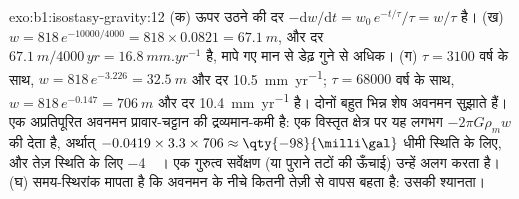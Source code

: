 \begin{solution}{exo:b1:isostasy-gravity:12}
(क) ऊपर उठने की दर $-\mathrm dw/\mathrm dt = w_0\,e^{-t/\tau}/\tau = w/\tau$ है। (ख) $w = 818\,e^{-10000/4000} = 818\times0.0821 = \qty{67.1}{m}$, और दर
$\qty{67.1}{m}/\num{4000}\,\unit{yr} = \qty{16.8}{mm.yr^{-1}}$ है, मापे गए मान से डेढ़ गुने से अधिक। (ग) $\tau = 3100$ वर्ष के साथ, $w =
818\,e^{-3.226} = \qty{32.5}{m}$ और दर \qty{10.5}{mm.yr^{-1}}; $\tau = \num{68000}$ वर्ष के साथ, $w = 818\,e^{-0.147} = \qty{706}{m}$ और दर
\qty{10.4}{mm.yr^{-1}} है। दोनों बहुत भिन्न शेष अवनमन सुझाते हैं। एक अप्रतिपूरित अवनमन प्रावार-चट्टान की द्रव्यमान-कमी है: एक विस्तृत क्षेत्र पर यह लगभग $-2\pi G\rho_m w$ की  देता है, अर्थात्
$-0.0419\times3.3\times706 \approx \qty{-98}{\milli\gal}$ धीमी स्थिति के लिए, और तेज़ स्थिति के लिए \qty{-4}{\milli\gal}। एक गुरुत्व सर्वेक्षण (या पुराने तटों की ऊँचाई) उन्हें अलग करता है। (घ) समय-स्थिरांक मापता है कि अवनमन के नीचे  कितनी तेज़ी से वापस बहता है: उसकी श्यानता।
\end{solution}

